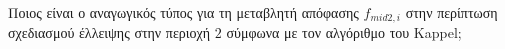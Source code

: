 \begin{exercise}
	Ποιος είναι ο αναγωγικός τύπος για τη μεταβλητή απόφασης $f_{mid2, i}$ στην περίπτωση σχεδιασμού έλλειψης στην περιοχή $2$ σύμφωνα με τον αλγόριθμο του Kappel;
\end{exercise}

